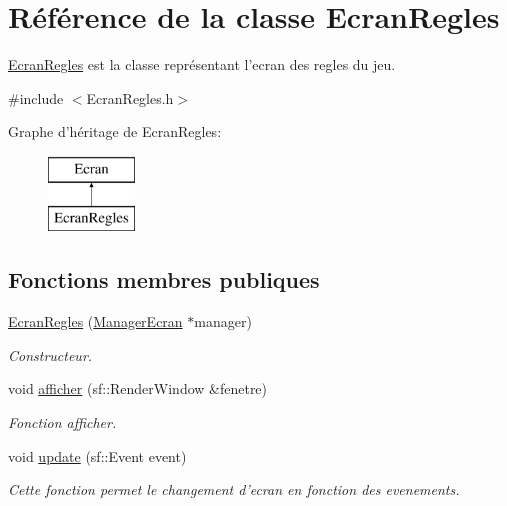 \hypertarget{classEcranRegles}{\section{\-Référence de la classe \-Ecran\-Regles}
\label{classEcranRegles}
}


\hyperlink{classEcranRegles}{\-Ecran\-Regles} est la classe représentant l'ecran des regles du jeu.  




{\ttfamily \#include $<$\-Ecran\-Regles.\-h$>$}

\-Graphe d'héritage de \-Ecran\-Regles\-:\begin{figure}[H]
\begin{center}
\leavevmode
\includegraphics[height=2.000000cm]{classEcranRegles}
\end{center}
\end{figure}
\subsection*{\-Fonctions membres publiques}
\begin{DoxyCompactItemize}
\item 
\hypertarget{classEcranRegles_af76f933a8096f76456612a610c0f9bff}{\hyperlink{classEcranRegles_af76f933a8096f76456612a610c0f9bff}{\-Ecran\-Regles} (\hyperlink{classManagerEcran}{\-Manager\-Ecran} $\ast$manager)}\label{classEcranRegles_af76f933a8096f76456612a610c0f9bff}

\begin{DoxyCompactList}\small\item\em \-Constructeur. \end{DoxyCompactList}\item 
void \hyperlink{classEcranRegles_aae93ff98faa75574547434e0e9aba41d}{afficher} (sf\-::\-Render\-Window \&fenetre)
\begin{DoxyCompactList}\small\item\em \-Fonction afficher. \end{DoxyCompactList}\item 
void \hyperlink{classEcranRegles_ad7029efa29a7584bd9aaee5051672a97}{update} (sf\-::\-Event event)
\begin{DoxyCompactList}\small\item\em \-Cette fonction permet le changement d'ecran en fonction des evenements. \end{DoxyCompactList}\end{DoxyCompactItemize}


